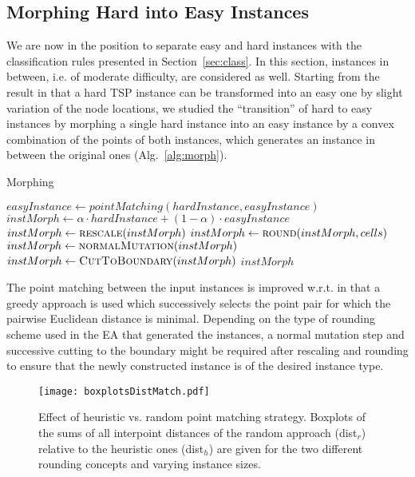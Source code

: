 \documentclass{article}
\begin{document}
\subsection{Morphing Hard into Easy Instances}

We are now in the position to separate easy and hard instances with
the classification rules presented in Section~\ref{sec:class}.  In this
section, instances in between, i.e. of moderate difficulty, are
considered as well. Starting from the result in \cite{EnglertRV07}
that a hard TSP instance can be transformed into an easy one by slight
variation of the node locations, we studied the ``transition'' of hard
to easy instances by morphing a single hard instance into an easy
instance by a convex combination of the points of both instances,
which generates an instance in between the original ones
(Alg.~\ref{alg:morph}).

\begin{algorithm}[h]
  \caption{Morphing}
  \label{alg:morph}
  \begin{algorithmic}
    \State $easyInstance \gets pointMatching(hardInstance,easyInstance)$
    \State $instMorph \gets \alpha\cdot hardInstance + (1-\alpha)\cdot easyInstance$
    \State $instMorph \gets \Call{rescale}{instMorph}$
    \State $instMorph \gets \Call{round}{instMorph,cells}$
    \State $instMorph \gets \Call{normalMutation}{instMorph}$
    \State $instMorph \gets \Call{CutToBoundary}{instMorph}$
    \EndIf
    \State \Return $instMorph$
    \EndFunction
  \end{algorithmic}
\end{algorithm}

The point matching between the input instances is improved
w.r.t. \cite{mersmann2012} in that a greedy approach is used which
successively selects the point pair for which the pairwise Euclidean
distance is minimal. Depending on the type of rounding scheme used in
the EA that generated the instances, a normal mutation step and successive cutting to the boundary might be
required after rescaling and rounding to ensure that the newly
constructed instance is of the desired instance type.

\begin{figure}
  \centering
  \texttt{[image: boxplotsDistMatch.pdf]}
  \caption{Effect of heuristic vs. random point matching
    strategy. Boxplots of the sums of all interpoint distances of the
    random approach (dist$_r$) relative to the heuristic ones
    (dist$_h$) are given for the two different rounding concepts and
    varying instance sizes.}
  \label{fig:effectmatch}
\end{figure}
\end{document}
